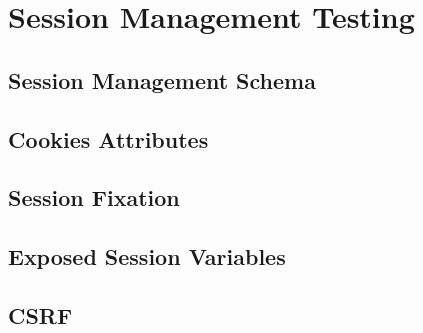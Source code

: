 \chapter{Session Management Testing}

\section{Session Management Schema}

\section{Cookies Attributes}

\section{Session Fixation}

\section{Exposed Session Variables}

\section{CSRF}